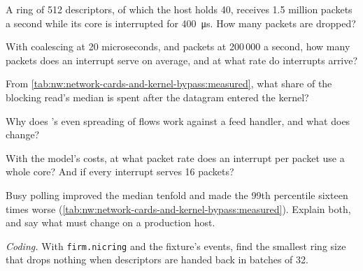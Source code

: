 \begin{exercise}[$\star$]\label{exo:nw:network-cards-and-kernel-bypass:1}
A ring of 512 descriptors, of which the host holds 40, receives 1.5 million packets a second while its core is interrupted for
\qty{400}{\micro\second}. How many packets are dropped?
\end{exercise}

\begin{exercise}[$\star$]\label{exo:nw:network-cards-and-kernel-bypass:2}
With coalescing at 20 microseconds, and packets at 200\,000 a second, how many packets does an interrupt serve on average, and at what
rate do interrupts arrive?
\end{exercise}

\begin{exercise}[$\star$]\label{exo:nw:network-cards-and-kernel-bypass:3}
From \cref{tab:nw:network-cards-and-kernel-bypass:measured}, what share of the blocking read's median is spent after the datagram entered
the kernel?
\end{exercise}

\begin{exercise}[$\star\star$]\label{exo:nw:network-cards-and-kernel-bypass:4}
Why does 's even spreading of flows work against a feed handler, and what does  change?
\end{exercise}

\begin{exercise}[$\star\star$]\label{exo:nw:network-cards-and-kernel-bypass:5}
With the model's costs, at what packet rate does an interrupt per packet use a whole core? And if every interrupt serves 16 packets?
\end{exercise}

\begin{exercise}[$\star\star$]\label{exo:nw:network-cards-and-kernel-bypass:6}
Busy polling improved the median tenfold and made the 99th percentile sixteen times worse
(\cref{tab:nw:network-cards-and-kernel-bypass:measured}). Explain both, and say what must change on a production host.
\end{exercise}

\begin{exercise}[$\star\star\star$]\label{exo:nw:network-cards-and-kernel-bypass:7}
\emph{Coding.} With \texttt{firm.nicring} and the fixture's events, find the smallest ring size that drops nothing when descriptors are
handed back in batches of 32.
\end{exercise}


